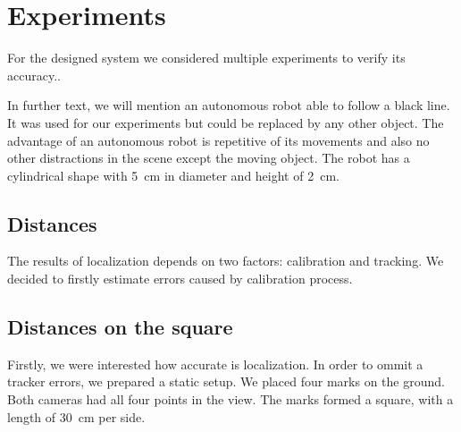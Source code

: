 \chapter{Experiments} 

For the designed system we considered multiple experiments to
verify its accuracy..

In further text, we will mention an autonomous robot able to follow a black
line.  It was used for our experiments but could be replaced by any other
object. The advantage of an autonomous robot is repetitive of its movements and
also no other distractions in the scene except the moving object. The robot has
a cylindrical shape with 5~cm in diameter and height of 2~cm.

%
%


\section{Distances}

The results of localization depends on two factors: calibration and tracking.
We decided to firstly estimate errors caused by calibration process.



\section{Distances on the square}

Firstly, we were interested how accurate is localization. In order to ommit a
tracker errors, we prepared a static setup.  We placed four marks on the
ground. Both cameras had all four points in the view. The marks formed a
square, with a length of 30~cm per side.

